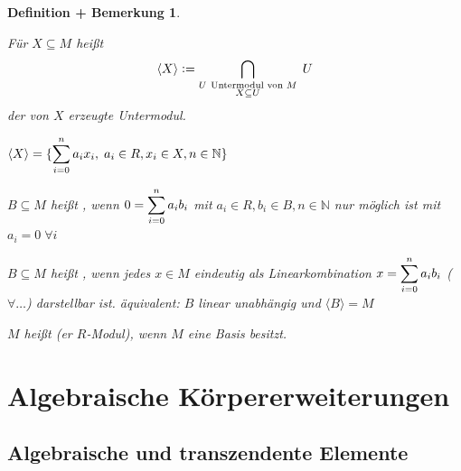 \documentclass[a4paper,10pt,german]{scrbook}
\theoremstyle{saetze}
\theoremstyle{definitionen}
\newtheorem{DefBem}[Def]{Definition + Bemerkung}
\begin{document}
\begin{DefBem}
\begin{enum}
\item Für $X \subseteq M$ heißt \[\langle X \rangle \mathrel{\mathop:}=
\bigcap_{\substack{U \mbox{ \scriptsize Untermodul von } M \\ X
\subseteq U}}\;U\] der von $X$ erzeugte Untermodul.

\item $\displaystyle \langle X \rangle = \{ \sum_{i=0}^n a_i x_i,\; a_i \in R,
x_i \in X, n \in \mathbb{N}\}$

\item $B \subseteq M$ heißt , wenn $\displaystyle 0 =
\sum_{i=0}^n a_i b_i$ mit $a_i \in R, b_i \in B, n \in \mathbb{N}$
nur möglich ist mit $a_i = 0\;\forall i$

\item $B \subseteq M$ heißt , wenn jedes $x \in M$
eindeutig als Linearkombination $\displaystyle x=\sum_{i=0}^n a_i b_i$
($\forall \dots$) darstellbar ist.
\newline äquivalent: $B$ linear unabhängig und $\langle B \rangle =
M$

\item $M$ heißt (er $R$-Modul), wenn $M$ eine Basis
besitzt.
\end{enum}
\end{DefBem}



\chapter{Algebraische Körpererweiterungen}

\section{Algebraische und transzendente Elemente}
\end{document}
